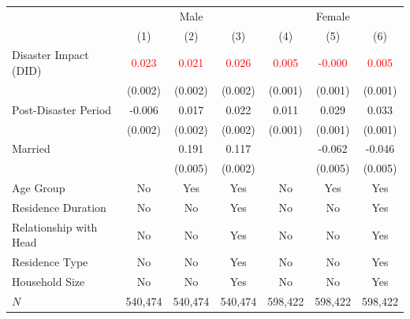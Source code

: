 \documentclass[serif, aspectratio=169]{beamer}
\begin{document}
\begin{frame}[label=employed]
\begin{table}[htbp]
\begin{tabular}{@{}l*{6}{c}@{}}
          &\multicolumn{3}{c}{Male}                                &\multicolumn{3}{c}{Female}                              \\\cmidrule(lr){2-4}\cmidrule(lr){5-7}
          &\multicolumn{1}{c}{(1)}         &\multicolumn{1}{c}{(2)}         &\multicolumn{1}{c}{(3)}         &\multicolumn{1}{c}{(4)}         &\multicolumn{1}{c}{(5)}         &\multicolumn{1}{c}{(6)}         \\
\toprule
Disaster Impact (DID)&    \textcolor{red}{0.023\sym{***}}&    \textcolor{red}{0.021\sym{***}}&    \textcolor{red}{0.026\sym{***}}&    \textcolor{red}{0.005\sym{***}}&   \textcolor{red}{-0.000}         &    \textcolor{red}{0.005\sym{***}}\\
          &  (0.002)         &  (0.002)         &  (0.002)         &  (0.001)         &  (0.001)         &  (0.001)         \\
\addlinespace
Post-Disaster Period&   -0.006\sym{***}&    0.017\sym{***}&    0.022\sym{***}&    0.011\sym{***}&    0.029\sym{***}&    0.033\sym{***}\\
          &  (0.002)         &  (0.002)         &  (0.002)         &  (0.001)         &  (0.001)         &  (0.001)         \\
\addlinespace
Married   &                  &    0.191\sym{***}&    0.117\sym{***}&                  &   -0.062\sym{***}&   -0.046\sym{***}\\
          &                  &  (0.005)         &  (0.002)         &                  &  (0.005)         &  (0.005)         \\
\midrule
Age Group   &       No         &      Yes         &      Yes         &       No         &      Yes         &      Yes         \\
Residence Duration&       No         &       No         &      Yes         &       No         &       No         &      Yes         \\
Relationship with Head&       No         &       No         &      Yes         &       No         &       No         &      Yes         \\
Residence Type&       No         &       No         &      Yes         &       No         &       No         &      Yes         \\
Household Size&       No         &       No         &      Yes         &       No         &       No         &      Yes         \\
$\textit{N}$&  540,474         &  540,474         &  540,474         &  598,422         &  598,422         &  598,422         \\

\end{tabular}
\end{table}
\end{frame}
\end{document}
